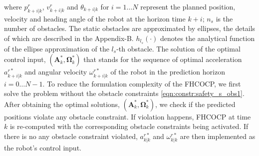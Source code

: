 \documentclass[journal]{IEEEtran}
\begin{document}
    where $p^r_{k+i|k}$, $v^r_{k+i|k}$ and $\theta_{k+i|k}$ for $i = 1 \dots N$ represent the planned position, velocity and heading angle of the robot at the horizon time $k+i$; %
    $n_s$ is the number of obstacles.
	The static obstacles are approximated by ellipses, the details of which are described in the Appendix-B.
	$h_{l_s}(\cdot)$ denotes the analytical function of the ellipse approximation of the $l_s$-th obstacle.
	The solution of the optimal control input, $(\mathbf{A}^*_k,\mathbf{\Omega}^*_k)$ that stands for the sequence of optimal acceleration $a^{r*}_{k+i|k}$ and angular velocity $\omega^{r*}_{k+i|k}$ of the robot in the prediction horizon $i = 0 \dots N-1$. To reduce the formulation complexity of the FHCOCP, we first solve the problem without the obstacle constraints \cref{eqn:constr:safety_s_obs1}. After obtaining the optimal solutions, $(\mathbf{A}^*_k,\mathbf{\Omega}^*_k)$, we check if the predicted positions violate any obstacle constraint. If violation happens, FHCOCP at time $k$ is re-computed with the corresponding obstacle constraints being activated. If there is no any obstacle constraint violated, $a^{r*}_{k|k}$ and $\omega^{r*}_{k|k}$ are then implemented as the robot's control input. 
    
\end{document}
